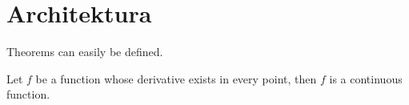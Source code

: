 \documentclass[thesis.tex]{subfiles}
\begin{document}
\chapter{Architektura}

Theorems can easily be defined.

\begin{theorem}
Let $f$ be a function whose derivative exists in every point, then $f$
is a continuous function.
\end{theorem}
\end{document}
